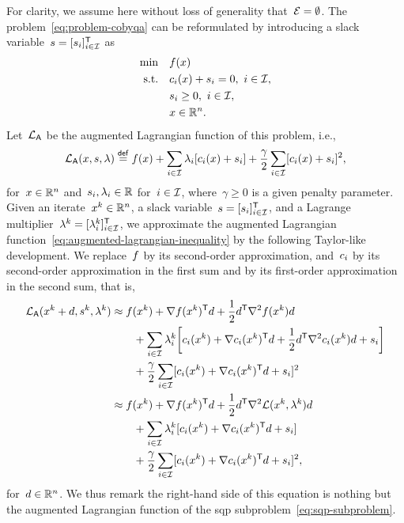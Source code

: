 For clarity, we assume here without loss of generality that~$\mathcal{E} = \emptyset$.
The problem~\cref{eq:problem-cobyqa} can be reformulated by introducing a slack variable~$s = [s_i]_{i \in \mathcal{I}}^{\mathsf{T}}$ as
\begin{align*}
    \min        & \quad \obj(\iter)\\
    \text{s.t.} & \quad \con{i}(\iter) + s_i = 0, ~ i \in \iub,\\
                & \quad s_i \ge 0, ~ i \in \iub,\\
                & \quad \iter \in \R^n.
\end{align*}
Let~$\lag[\mathsf{A}]$ be the augmented Lagrangian function of this problem, i.e.,
\begin{equation}
    \label{eq:augmented-lagrangian-inequality}
    \lag[\mathsf{A}](\iter, s, \lambda) \eqdef \obj(\iter) + \sum_{i \in \iub} \lambda_i [\con{i}(\iter) + s_i] + \frac{\gamma}{2} \sum_{i \in \iub} [\con{i}(\iter) + s_i]^2,
\end{equation}
for~$\iter \in \R^n$ and~$s_i, \lambda_i \in \mathbb{R}$ for~$i \in \mathcal{I}$, where~$\gamma \ge 0$ is a given penalty parameter.
Given an iterate~$\iter[k] \in \R^n$, a slack variable~$s = [s_i]_{i \in \mathcal{I}}^{\mathsf{T}}$, and a Lagrange multiplier~$\lambda^k = [\lambda_i^k]_{i \in \mathcal{I}}^{\mathsf{T}}$, we approximate the augmented Lagrangian function~\cref{eq:augmented-lagrangian-inequality} by the following Taylor-like development.
We replace~$f$ by its second-order approximation, and~$c_{i}$ by its second-order approximation in the first sum and by its first-order approximation in the second sum, that is,
\begin{align*}
    \lag[\mathsf{A}](\iter[k] + \step, s^k, \lambda^k)  & \approx \obj(\iter[k]) + \nabla \obj(\iter[k])^{\T} \step + \frac{1}{2} \step^{\T} \nabla^2 \obj(\iter[k]) \step\\
                                                        & \qquad + \sum_{i \in \iub} \lambda_i^k \bigg[ \con{i}(\iter[k]) + \nabla \con{i}(\iter[k])^{\T} \step + \frac{1}{2} \step^{\T} \nabla^2 \con{i}(\iter[k]) \step + s_i \bigg]\\
                                                        & \qquad + \frac{\gamma}{2} \sum_{i \in \iub} [\con{i}(\iter[k]) + \nabla \con{i}(\iter[k])^{\T} \step + s_i]^2\\
                                                        & \approx \obj(\iter[k]) + \nabla \obj(\iter[k])^{\T} \step + \frac{1}{2} \step^{\T} \nabla^2 \lag(\iter[k], \lambda^k) \step\\
                                                        & \qquad + \sum_{i \in \iub} \lambda_i^k [\con{i}(\iter[k]) + \nabla \con{i}(\iter[k])^{\T} \step + s_i]\\
                                                        & \qquad + \frac{\gamma}{2} \sum_{i \in \iub} [\con{i}(\iter[k]) + \nabla \con{i}(\iter[k])^{\T} \step + s_i]^2,
\end{align*}
for~$\step \in \R^n$.
We thus remark the right-hand side of this equation is nothing but the augmented Lagrangian function of the \gls{sqp} subproblem~\cref{eq:sqp-subproblem}.


